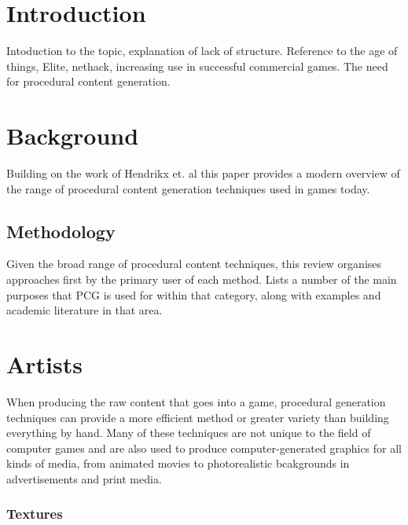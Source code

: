 \documentclass{./acm_proc_article-sp}
\begin{document}



\section{Introduction}
Intoduction to the topic, explanation of lack of structure. Reference to the age of things, Elite\cite{elite}, nethack, increasing use in successful commercial games. The need for procedural content generation.

\section{Background}
Building on the work of Hendrikx et. al \cite{hendrikx2012procedural} this paper provides a modern overview of the range of procedural content generation techniques used in games today.
\subsection{Methodology}
Given the broad range of procedural content techniques, this review organises approaches first by the primary user of each method. Lists a number of the main purposes that PCG is used for within that category, along with examples and academic literature in that area.


\section{Artists}
When producing the raw content that goes into a game, procedural generation techniques can provide a more efficient method or greater variety than building everything by hand. Many of these techniques are not unique to the field of computer games and are also used to produce computer-generated graphics for all kinds of media, from animated movies to photorealistic bcakgrounds in advertisements and print media.

\subsubsection{Textures}
\end{document}
